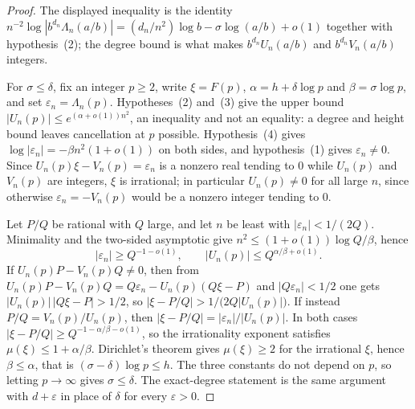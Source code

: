 \begin{proof}
The displayed inequality is the identity
$n^{-2}\log|b^{d_n}\Lambda_n(a/b)|=(d_n/n^{2})\log b-\sigma\log(a/b)+o(1)$
together with hypothesis~(2); the degree bound is what makes
$b^{d_n}U_n(a/b)$ and $b^{d_n}V_n(a/b)$ integers.

For $\sigma\le\delta$, fix an integer $p\ge2$, write $\xi=F(p)$,
$\alpha=h+\delta\log p$ and $\beta=\sigma\log p$, and set
$\varepsilon_n=\Lambda_n(p)$.  Hypotheses~(2) and~(3) give the upper bound
$|U_n(p)|\le e^{(\alpha+o(1))n^{2}}$, an inequality and not an equality: a
degree and height bound leaves cancellation at $p$ possible.  Hypothesis~(4)
gives $\log|\varepsilon_n|=-\beta n^{2}(1+o(1))$ on both sides, and
hypothesis~(1) gives $\varepsilon_n\ne0$.  Since $U_n(p)\xi-V_n(p)=\varepsilon_n$
is a nonzero real tending to $0$ while $U_n(p)$ and $V_n(p)$ are integers, $\xi$
is irrational; in particular $U_n(p)\ne0$ for all large $n$, since otherwise
$\varepsilon_n=-V_n(p)$ would be a nonzero integer tending to $0$.

Let $P/Q$ be rational with $Q$ large, and let $n$ be least with
$|\varepsilon_n|<1/(2Q)$.  Minimality and the two-sided asymptotic give
$n^{2}\le(1+o(1))\log Q/\beta$, hence
\[
 |\varepsilon_n|\ge Q^{-1-o(1)},\qquad |U_n(p)|\le Q^{\alpha/\beta+o(1)} .
\]
If $U_n(p)P-V_n(p)Q\ne0$, then from
$U_n(p)P-V_n(p)Q=Q\varepsilon_n-U_n(p)(Q\xi-P)$ and $|Q\varepsilon_n|<1/2$ one
gets $|U_n(p)|\,|Q\xi-P|>1/2$, so
$|\xi-P/Q|>1/\bigl(2Q|U_n(p)|\bigr)$.  If instead $P/Q=V_n(p)/U_n(p)$, then
$|\xi-P/Q|=|\varepsilon_n|/|U_n(p)|$.  In both cases
$|\xi-P/Q|\ge Q^{-1-\alpha/\beta-o(1)}$, so the irrationality exponent satisfies
$\mu(\xi)\le1+\alpha/\beta$.  Dirichlet's theorem gives $\mu(\xi)\ge2$ for the
irrational $\xi$, hence $\beta\le\alpha$, that is
$(\sigma-\delta)\log p\le h$.  The three constants do not depend on $p$, so
letting $p\to\infty$ gives $\sigma\le\delta$.  The exact-degree statement is the
same argument with $d+\varepsilon$ in place of $\delta$ for every
$\varepsilon>0$.
\end{proof}

